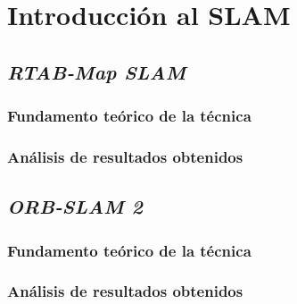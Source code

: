 \section{Introducción al SLAM}

\subsection{\textit{RTAB-Map SLAM}}
\subsubsection{Fundamento teórico de la técnica}
\subsubsection{Análisis de resultados obtenidos}

\subsection{\textit{ORB-SLAM 2}}
\subsubsection{Fundamento teórico de la técnica}
\subsubsection{Análisis de resultados obtenidos}